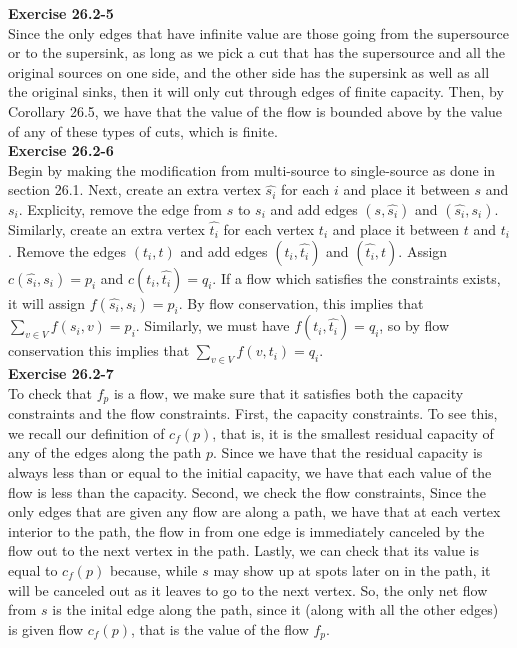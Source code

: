 \documentclass{article}
\begin{document}
\noindent\textbf{Exercise 26.2-5}\\

Since the only edges that have infinite value are those going from the supersource or to the supersink, as long as we pick a cut that has the supersource and all the original sources on one side, and the other side has the supersink as well as all the original sinks, then it will only cut through edges of finite capacity. Then, by Corollary 26.5, we have that the value of the flow is bounded above by the value of any of these types of cuts, which is finite.\\

\noindent\textbf{Exercise 26.2-6}\\

Begin by making the modification from multi-source to single-source as done in section 26.1.  Next, create an extra vertex $\hat{s_i}$ for each $i$ and place it between $s$ and $s_i$.  Explicity, remove the edge from $s$ to $s_i$ and add edges $(s, \hat{s_i})$ and $(\hat{s_i}, s_i)$.  Similarly, create an extra vertex $\hat{t_i}$ for each vertex $t_i$ and place it between $t$ and $t_i$.  Remove the edges $(t_i, t)$ and add edges $(t_i, \hat{t_i})$ and $(\hat{t_i}, t)$.  Assign $c(\hat{s_i},s_i) = p_i$ and $c(t_i, \hat{t_i}) = q_i$.  If a flow which satisfies the constraints exists, it will assign $f(\hat{s_i}, s_i) = p_i$.  By flow conservation, this implies that $\sum_{v \in V} f(s_i, v) = p_i$.  Similarly, we must have $f(t_i, \hat{t_i}) = q_i$, so by flow conservation this implies that $\sum_{v \in V} f(v,t_i) = q_i$.\\

\noindent\textbf{Exercise 26.2-7}\\

To check that $f_p$ is a flow, we make sure that it satisfies both the capacity constraints and the flow constraints. First, the capacity constraints. To see this, we recall our definition of $c_f(p)$, that is, it is the smallest residual capacity of any of the edges along the path $p$. Since we have that the residual capacity is always less than or equal to the initial capacity, we have that each value of the flow is less than the capacity. Second, we check the flow constraints, Since the only edges that are given any flow are along a path, we have that at each vertex interior to the path, the flow in from one edge is immediately canceled by the flow out to the next vertex in the path. Lastly, we can check that its value is equal to $c_f(p)$ because, while $s$ may show up at spots later on in the path, it will be canceled out as it leaves to go to the next vertex. So, the only net flow from $s$ is the inital edge along the path, since it (along with all the other edges) is given flow  $c_f(p)$, that is the value of the flow $f_p$.\\
\end{document}
